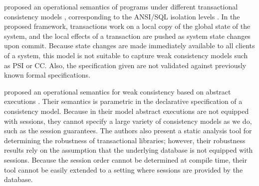 \citeauthor{alonetogether} proposed an operational semantics of programs 
under different transactional consistency models \cite{alonetogether}, 
corresponding to the ANSI/SQL isolation levels \cite{si}.
In the proposed framework, transactions work on a local copy of the global state 
of the system, and the local effects of a transaction are pushed as 
system state changes upon commit. Because state changes 
are made immediately available to all clients of a system, this model 
is not suitable to capture weak consistency models such as PSI or CC. 
Also, the specification given are not validated against previously known 
formal specifications.

\citeauthor{sureshConcur} proposed an operational semantics for weak consistency 
based on abstract executions \cite{sureshConcur}. Their semantics 
is parametric in the declarative specification of a consistency model. Because 
in their model abstract executions are not equipped with sessions, they cannot 
specify a large variety of consistency models as we do, such as the session guarantees. 
The authors also present a static analysis tool for determining the robustness of transactional 
libraries; however, their robustness results rely on the assumption that the underlying database 
is not equipped with sessions. Because the session order cannot be determined at compile time, 
their tool cannot be easily extended to a setting where sessions are provided by the database. 


